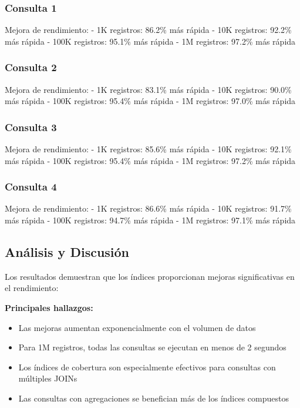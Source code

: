 \documentclass[12pt,a4paper]{article}
\begin{document}
\subsubsection{Consulta 1}
Mejora de rendimiento:
- 1K registros: 86.2\% más rápida
- 10K registros: 92.2\% más rápida  
- 100K registros: 95.1\% más rápida
- 1M registros: 97.2\% más rápida

\subsubsection{Consulta 2}
Mejora de rendimiento:
- 1K registros: 83.1\% más rápida
- 10K registros: 90.0\% más rápida
- 100K registros: 95.4\% más rápida
- 1M registros: 97.0\% más rápida

\subsubsection{Consulta 3}
Mejora de rendimiento:
- 1K registros: 85.6\% más rápida
- 10K registros: 92.1\% más rápida
- 100K registros: 95.4\% más rápida
- 1M registros: 97.2\% más rápida

\subsubsection{Consulta 4}
Mejora de rendimiento:
- 1K registros: 86.6\% más rápida
- 10K registros: 91.7\% más rápida
- 100K registros: 94.7\% más rápida
- 1M registros: 97.1\% más rápida

\subsection{Análisis y Discusión}

Los resultados demuestran que los índices proporcionan mejoras significativas en el rendimiento:

\textbf{Principales hallazgos:}
\begin{itemize}
    \item Las mejoras aumentan exponencialmente con el volumen de datos
    \item Para 1M registros, todas las consultas se ejecutan en menos de 2 segundos
    \item Los índices de cobertura son especialmente efectivos para consultas con múltiples JOINs
    \item Las consultas con agregaciones se benefician más de los índices compuestos
\end{itemize}
\end{document}
